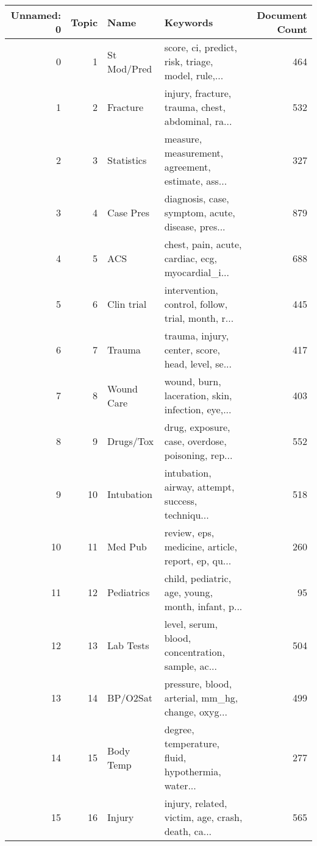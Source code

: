 \begin{tabular}{rrllr}
\toprule
 Unnamed: 0 &  Topic &          Name &                                           Keywords &  Document Count \\
\midrule
          0 &      1 &   St Mod/Pred &  score, ci, predict, risk, triage, model, rule,... &             464 \\
          1 &      2 &      Fracture &  injury, fracture, trauma, chest, abdominal, ra... &             532 \\
          2 &      3 &    Statistics &  measure, measurement, agreement, estimate, ass... &             327 \\
          3 &      4 &     Case Pres &  diagnosis, case, symptom, acute, disease, pres... &             879 \\
          4 &      5 &           ACS &  chest, pain, acute, cardiac, ecg, myocardial\_i... &             688 \\
          5 &      6 &    Clin trial &  intervention, control, follow, trial, month, r... &             445 \\
          6 &      7 &        Trauma &  trauma, injury, center, score, head, level, se... &             417 \\
          7 &      8 &    Wound Care &  wound, burn, laceration, skin, infection, eye,... &             403 \\
          8 &      9 &     Drugs/Tox &  drug, exposure, case, overdose, poisoning, rep... &             552 \\
          9 &     10 &    Intubation &  intubation, airway, attempt, success, techniqu... &             518 \\
         10 &     11 &       Med Pub &  review, eps, medicine, article, report, ep, qu... &             260 \\
         11 &     12 &    Pediatrics &  child, pediatric, age, young, month, infant, p... &              95 \\
         12 &     13 &     Lab Tests &  level, serum, blood, concentration, sample, ac... &             504 \\
         13 &     14 &      BP/O2Sat &  pressure, blood, arterial, mm\_hg, change, oxyg... &             499 \\
         14 &     15 &     Body Temp &  degree, temperature, fluid, hypothermia, water... &             277 \\
         15 &     16 &        Injury &  injury, related, victim, age, crash, death, ca... &             565 \\

\end{tabular}

